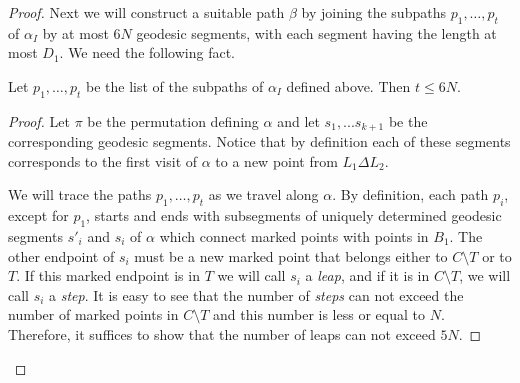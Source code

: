 \begin{proof}
Next we will construct a suitable path $\beta$ by joining the subpaths $p_1,\ldots, p_t$ of $\alpha_I$ by at most $6N$ geodesic segments, with each segment having the length at most $D_1$. We need  the following fact.
\begin{claim}
 Let $p_1,\ldots,p_t$ be the list of the subpaths of $\alpha_I$ defined above. Then $t \leq 6N$.
\end{claim}

\begin{proof}
  Let $\pi$ be the permutation defining $\alpha$ and let $s_1,...s_{k+1}$ be the corresponding geodesic segments. Notice that by definition each of these segments corresponds to the first visit of $\alpha$ to a new point from $ L_1 \Delta L_2$.  

  We will trace the paths $p_1, \ldots, p_t$ as we travel along $\alpha$. By definition, each path $p_i$, except for $p_1$,  starts and ends with subsegments of uniquely determined geodesic segments $s'_i$ and $s_i$ of $\alpha$ which connect marked points with points in $B_1$. The other endpoint of $s_i$ must be a new marked point that belongs either to $C \setminus T$ or to $T$. If this marked endpoint is in $T$ we will call $s_i$ a \textit{leap}, and if it is in $C \setminus T$, we will call $s_i$ a \textit{step}. It is easy to see that the number of \textit{steps} can not exceed the number of marked points in $C \setminus T$ and this number is less or equal to $N$. Therefore, it suffices to show that the number of leaps can not exceed $5N$. 
  

\end{proof}
\end{proof}
